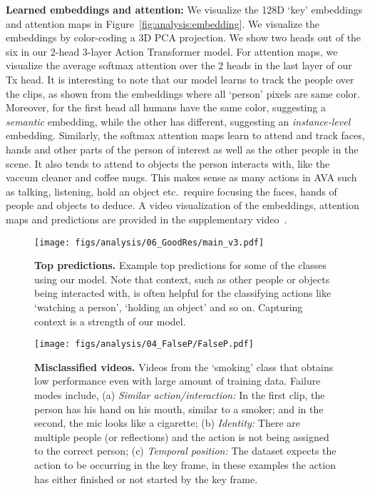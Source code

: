 \documentclass[10pt,twocolumn,letterpaper]{article}
\newcommand{\Tx}[0]{Action Transformer}
\begin{document}
{\bf \noindent Learned embeddings and attention:}
We visualize the 128D `key' embeddings and attention maps in Figure~\ref{fig:analysis:embedding}. We visualize the embeddings by color-coding a 3D PCA projection. We show two heads out of the six in our 2-head 3-layer \Tx{} model. For attention maps, we visualize the average softmax attention over the 2 heads in the last layer of our Tx head. It is interesting to note that our model learns to track the people over the clips, as shown from the embeddings where all `person' pixels are same color. Moreover, for the first head all humans have the same color, suggesting a {\em semantic} embedding, while the other has different, suggesting an {\em instance-level} embedding.
Similarly, the softmax attention maps learn to attend and track faces, hands and other parts of the person of interest as well as the other people in the scene. It also tends to attend to objects the person interacts with, like the vaccum cleaner and coffee mugs.
This makes sense as many actions in AVA such as talking, listening, hold an object etc.\ require focusing the faces, hands of people and objects to deduce. 
A video visualization of the embeddings, attention maps and predictions are provided in the supplementary video~\cite{supp_video}.















\begin{figure}[t]
\centering
\texttt{[image: figs/analysis/06\_GoodRes/main\_v3.pdf]}
\caption{
{\bf Top predictions.}
Example top predictions for some of the classes using our model.
Note that context, such as other people or objects being interacted with, is often helpful for the classifying actions like `watching a person', `holding an object' and so on. Capturing context is a strength of our model.
}\label{fig:analysis:true_p}
\end{figure}

\begin{figure}[t]
\centering
\texttt{[image: figs/analysis/04\_FalseP/FalseP.pdf]}
\caption{
{\bf Misclassified videos.}
Videos from the `smoking' class that obtains low performance even with large amount of training data.
Failure modes include, (a) {\em Similar action/interaction:} In the first clip, the person has his hand on his mouth, similar to a smoker; and in the second, the mic looks like a cigarette; (b) {\em Identity:} There are multiple people (or reflections) and the action is not being assigned to the correct person; (c) {\em Temporal position:} The dataset expects the action to be occurring in the key frame, in these examples the action has either finished or not started by the key frame.
}\label{fig:analysis:false_p}
\end{figure}
\end{document}
